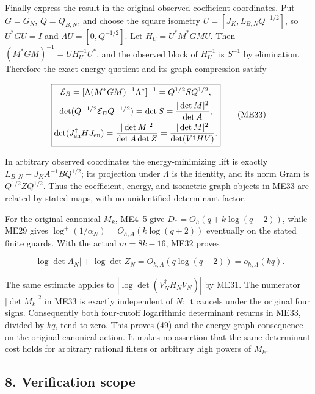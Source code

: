 \documentclass[11pt]{article}
\begin{document}
Finally express the result in the original observed coefficient coordinates. Put \(G=G_N\), \(Q=Q_{B,N}\), and choose the square isometry \(U=[J_K,L_{B,N}Q^{-1/2}]\), so \(U^*GU=I\) and \(\Lambda U=[0,Q^{-1/2}]\). Let \(H_U=U^*M^*GMU\). Then \((M^*GM)^{-1}=UH_U^{-1}U^*\), and the observed block of \(H_U^{-1}\) is \(S^{-1}\) by elimination. Therefore the exact energy quotient and its graph compression satisfy

\[
\boxed{\begin{gathered}
\mathcal E_B=[\Lambda(M^*GM)^{-1}\Lambda^*]^{-1}
=Q^{1/2}SQ^{1/2},\\
\det(Q^{-1/2}\mathcal E_BQ^{-1/2})
=\det S=\frac{|\det M|^2}{\det A},\\
\det(J_{\rm en}^\dagger HJ_{\rm en})
=\frac{|\det M|^2}{\det A\det Z}
=\frac{|\det M|^2}{\det(V^\dagger HV)}.
\end{gathered}}
\tag{ME33}
\]

In arbitrary observed coordinates the energy-minimizing lift is exactly \(L_{B,N}-J_KA^{-1}B Q^{1/2}\); its projection under \(\Lambda\) is the identity, and its norm Gram is \(Q^{1/2}ZQ^{1/2}\). Thus the coefficient, energy, and isometric graph objects in ME33 are related by stated maps, with no unidentified determinant factor.

For the original canonical \(M_k\), ME4--5 give \(D_*=O_h(q+k\log(q+2))\), while ME29 gives \(\log^+(1/\alpha_N)=O_{h,A}(k\log(q+2))\) eventually on the stated finite guards. With the actual \(m=8k-16\), ME32 proves

\[
\boxed{|\log\det A_N|+\log\det Z_N
=O_{h,A}(q\log(q+2))=o_{h,A}(kq).}
\tag{ME34}
\]

The same estimate applies to \(|\log\det(V_N^\dagger H_NV_N)|\) by ME31. The numerator \(|\det M_k|^2\) in ME33 is exactly independent of \(N\); it cancels under the original four signs. Consequently both four-cutoff logarithmic determinant returns in ME33, divided by \(kq\), tend to zero. This proves (49) and the energy-graph consequence on the original canonical action. It makes no assertion that the same determinant cost holds for arbitrary rational filters or arbitrary high powers of \(M_k\).

\subsection{8. Verification scope}\label{verification-scope}
\end{document}
